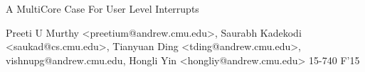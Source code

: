 \documentclass[11pt]{article}
\begin{document}
\vspace*{-5ex}\centerline{\Large A MultiCore Case For User Level Interrupts}
\vspace*{-.5ex}
\begin{center}
Preeti U Murthy <preetium@andrew.cmu.edu>, Saurabh Kadekodi <saukad@cs.cmu.edu>, Tianyuan Ding <tding@andrew.cmu.edu>,
vishnupg@andrew.cmu.edu, Hongli Yin <hongliy@andrew.cmu.edu>
15-740 F'15
\end{center}











 

\end{document}
